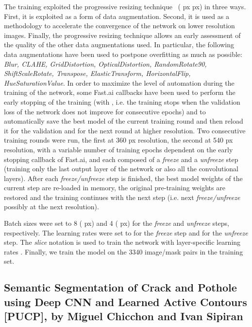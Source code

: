 \documentclass[twocolumn]{article}
\newcommand{\PUCP}[0]{PUCP}\newcommand{\HCMUS}[0]{HCMUS}\newcommand{\baseline}[0]{Baseline}
\begin{document}
The training exploited the progressive resizing technique~\cite{cellular_super_resolution} ( px   px) in three ways. First, it is exploited as a form of data augmentation. Second, it is used as a methodology to accelerate the convergence of the network on lower resolution images. Finally, the progressive resizing technique allows an early assessment of the quality of the other data augmentations used. In particular, the following data augmentations have been used to postpone overfitting as much as possible: \emph{Blur, CLAHE, GridDistortion, OpticalDistortion, RandomRotate90, ShiftScaleRotate, Transpose, ElasticTransform, HorizontalFlip, HueSaturationValue}. 
In order to maximize the level of automation during the training of the network, some Fast.ai callbacks have been used to perform the early stopping of the training (with , i.e. the training stops when the validation loss of the network does not improve for  consecutive epochs) and to automatically save the best model of the current training round and then reload it for the validation and for the next round at higher resolution. 
Two consecutive training rounds were run, the first at 360 px resolution, the second at 540 px resolution, with a variable number of training epochs dependent on the early stopping callback of Fast.ai, and each composed of a \textit{freeze} and a \textit{unfreeze} step (training only the last output layer of the network or also all the convolutional layers). After each \textit{freeze/unfreeze} step is finished, the best model weights of the current step are re-loaded in memory, the original pre-training weights are restored and the training continues with the next step (i.e. next \textit{freeze/unfreeze} possibly at the next resolution).

Batch sizes were set to 8 ( px) and 4 ( px) for the \emph{freeze} and \emph{unfreeze} steps, respectively. The learning rates were set to  for the \emph{freeze} step and  for the \emph{unfreeze} step. The \emph{slice} notation is used to train the network with layer-specific learning rates \cite{layer-specific-learning-rates}. Finally, we train the model on the 3340 image/mask pairs in the training set.




\subsection{Semantic Segmentation of Crack and Pothole using Deep CNN and Learned Active Contours [\PUCP{}], by Miguel Chicchon and Ivan Sipiran}
\end{document}
